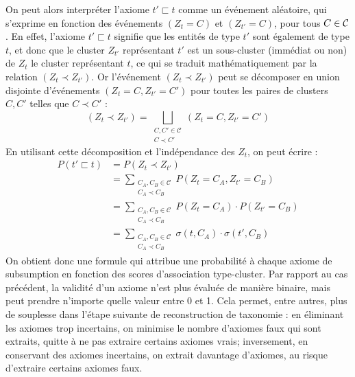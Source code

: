 On peut alors interpréter l'axiome $t' \sqsubset t$ comme un événement aléatoire, qui s'exprime en fonction des événements $(Z_t = C)$ et $(Z_{t'} = C)$, pour tous $C \in \mathcal{C}$.
En effet, l'axiome $t' \sqsubset t$ signifie que les entités de type $t'$ sont également de type $t$, et donc que le cluster $Z_{t'}$ représentant $t'$ est un sous-cluster (immédiat ou non) de $Z_t$ le cluster représentant $t$, ce qui se traduit mathématiquement par la relation $(Z_{t} \prec Z_{t'})$.
Or l'événement $(Z_{t} \prec Z_{t'})$ peut se décomposer en union disjointe d'événements $(Z_t = C, Z_{t'} = C')$ pour toutes les paires de clusters $C, C'$ telles que $C \prec C'$ :
\begin{equation}
    (Z_t \prec Z_{t'}) = \bigsqcup_{\substack{C, C' \in \mathcal{C} \\ C \prec C'}} (Z_t = C, Z_{t'} = C')
\end{equation}
%
%
En utilisant cette décomposition et l'indépendance des $Z_t$, on peut écrire :
\begin{align}
    \label{eq:softmapping_2}
    P(t' \sqsubset t) &= P(Z_t \prec Z_{t'}) \\
    &= \sum_{\substack{C_A, C_B \in \mathcal{C} \\ C_A \prec C_B}} P(Z_{t }= C_A, Z_{t'} = C_B) \nonumber \\
    &= \sum_{\substack{C_A, C_B \in \mathcal{C} \\ C_A \prec C_B}} P(Z_{t }= C_A)\cdot P(Z_{t'} = C_B) \\
    &= \sum_{\substack{C_A, C_B \in \mathcal{C} \\ C_A \prec C_B}} \sigma(t, C_A) \cdot \sigma(t', C_B)
\end{align}
On obtient donc une formule qui attribue une probabilité à chaque axiome de subsumption en fonction des scores d'association type-cluster. Par rapport au cas précédent, la validité d'un axiome n'est plus évaluée de manière binaire, mais peut prendre n'importe quelle valeur entre 0 et 1. Cela permet, entre autres, plus de souplesse dans l'étape suivante de reconstruction de taxonomie : en éliminant les axiomes trop incertains, on minimise le nombre d'axiomes faux qui sont extraits, quitte à ne pas extraire certains axiomes vrais; inversement, en conservant des axiomes incertains, on extrait davantage d'axiomes, au risque d'extraire certains axiomes faux.%
